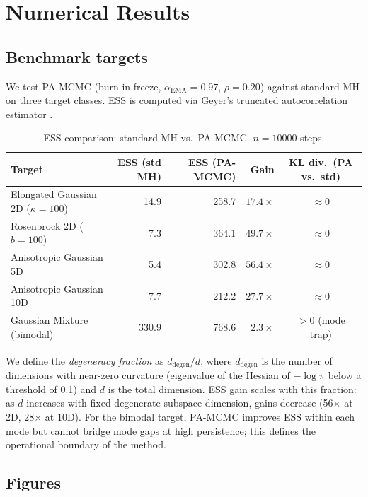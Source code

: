 \documentclass[11pt]{article}
\theoremstyle{definition}
\begin{document}
\section{Numerical Results}
\label{sec:results}

\subsection{Benchmark targets}

We test PA-MCMC (burn-in-freeze, $\alpha_{\mathrm{EMA}} = 0.97$, $\rho = 0.20$)
against standard MH on three target classes.
ESS is computed via Geyer's truncated autocorrelation estimator
\cite{geyer1992practical}.

\begin{table}[h]
\centering
\caption{ESS comparison: standard MH vs.\ PA-MCMC. $n = 10000$ steps.}
\label{tab:ess}
\begin{tabular}{lrrrc}
\toprule
Target & ESS (std MH) & ESS (PA-MCMC) & Gain & KL div.\ (PA vs.\ std) \\
\midrule
Elongated Gaussian 2D ($\kappa=100$) & 14.9  & 258.7 & $17.4\times$ & $\approx 0$ \\
Rosenbrock 2D ($b=100$)              &  7.3  & 364.1 & $49.7\times$ & $\approx 0$ \\
Anisotropic Gaussian 5D              &  5.4  & 302.8 & $56.4\times$ & $\approx 0$ \\
Anisotropic Gaussian 10D             &  7.7  & 212.2 & $27.7\times$ & $\approx 0$ \\
Gaussian Mixture (bimodal)           & 330.9 & 768.6 & $ 2.3\times$ & $> 0$ (mode trap) \\
\bottomrule
\end{tabular}
\end{table}

We define the \emph{degeneracy fraction} as $d_{\mathrm{degen}}/d$, where
$d_{\mathrm{degen}}$ is the number of dimensions with near-zero curvature
(eigenvalue of the Hessian of $-\log\pi$ below a threshold of 0.1) and $d$
is the total dimension.
ESS gain scales with this fraction: as $d$ increases with fixed degenerate
subspace dimension, gains decrease (56$\times$ at 2D, 28$\times$ at 10D).
For the bimodal target, PA-MCMC improves ESS within each mode but cannot bridge
mode gaps at high persistence; this defines the operational boundary of the method.

\subsection{Figures}
\end{document}
